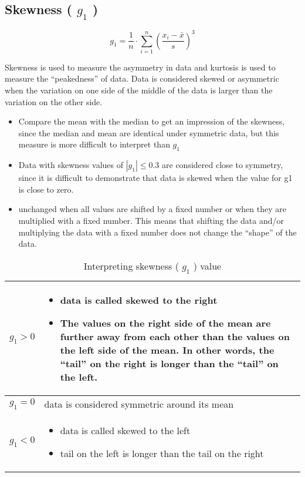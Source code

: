 \subsection{Skewness ( $g_1$ ) \cite{ism-1}}\label{Skewness}
\[
    g_1 = \displaystyle\frac{1}{n} \cdot \sum_{i=1}^{n} \left( \frac{x_i - \bar{x}}{s} \right)^3
\]

Skewness is used to measure the asymmetry in data and kurtosis is used to measure the “peakedness” of data. Data is considered skewed or asymmetric when the variation on one side of the middle of the data is larger than the variation on the other side.

\begin{itemize}
    \item Compare the mean with the median to get an impression of the skewness, since the median and mean are identical under symmetric data, but this measure is more difficult to interpret than $g_1$
    \item Data with skewness values of $|g_1| \leq 0.3$ are considered close to symmetry, since it is difficult to demonstrate that data is skewed when the value for g1 is close to zero.
    \item unchanged when all values are shifted by a fixed number or when they are multiplied with a fixed number. This means that shifting the data and/or multiplying the data with a fixed number does not change the “shape” of the data.
\end{itemize}

\begin{table}
    \centering
    \begin{tabular}{|c|m{13cm}|}
        \hline
        $g_1 > 0$ & \vspace{0.5cm}\begin{itemize}
            \item data is called skewed to the right
            \item The values on the right side of the mean are further away from each other than the values on the left side of the mean. In other words, the “tail” on the right is longer than the “tail” on the left.
        \end{itemize}\vspace{-0.5cm} \\ \hline
        $g_1 = 0$ & data is considered symmetric around its mean \\ \hline
        $g_1 < 0$ & \vspace{0.5cm} \begin{itemize}
            \item data is called skewed to the left
            \item tail on the left is longer than the tail on the right
        \end{itemize} \vspace{-1cm} \\ \hline
    \end{tabular}
    \caption{Interpreting skewness ( $g_1$ ) value}
\end{table}

